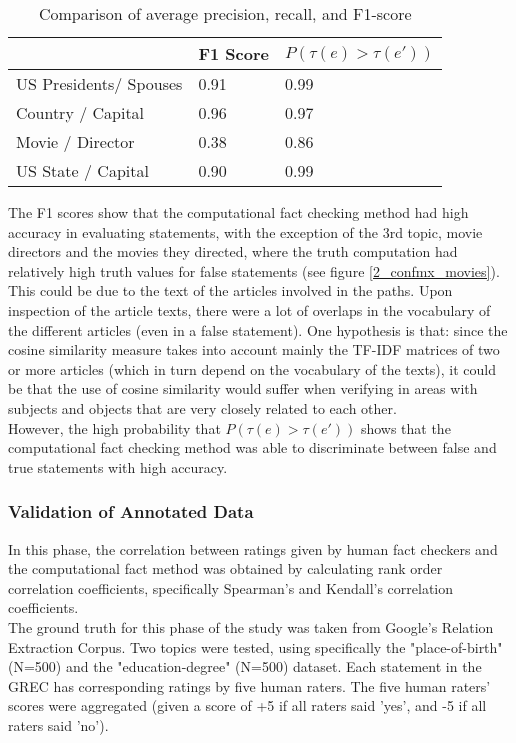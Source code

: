 \documentclass[10pt,11pt,12pt,oneside]{book}
\begin{document}
\begin{table}[H]
	\begin{tabular}{ | p{5cm} || p{4.8cm} | p{4.8cm} |}
		\hline
		& F1 Score & $ P (\tau (e) > \tau (e \prime)) $ \\
		\hline
		US Presidents/ Spouses & 0.91 & 0.99\\
		\hline
		Country / Capital & 0.96 & 0.97\\  
		\hline
		Movie / Director & 0.38 & 0.86\\
		\hline
		US State / Capital & 0.90 & 0.99\\
		\hline
	\end{tabular}
	\caption{Comparison of average precision, recall, and F1-score}
	\label{table_phase2}
\end{table}

The F1 scores show that the computational fact checking method had high accuracy in evaluating statements, with the exception of the 3rd topic, movie directors and the movies they directed, where the truth computation had relatively high truth values for false statements (see figure \ref{2_confmx_movies}). This could be due to the text of the articles involved in the paths. Upon inspection of the article texts, there were a lot of overlaps in the vocabulary of the different articles (even in a false statement). One hypothesis is that: since the cosine similarity measure takes into account mainly the TF-IDF matrices of two or more articles (which in turn depend on the vocabulary of the texts), it could be that the use of cosine similarity would suffer when verifying in areas with subjects and objects that are very closely related to each other.\\

However, the high probability that $ P (\tau (e) > \tau (e \prime)) $ shows that the computational fact checking method was able to discriminate between false and true statements with high accuracy.
\newpage
\subsubsection{Validation of Annotated Data}
In this phase, the correlation between ratings given by human fact checkers and the computational fact method was obtained by calculating rank order correlation coefficients, specifically Spearman's and Kendall's correlation coefficients.\\

The ground truth for this phase of the study was taken from Google's Relation Extraction Corpus. Two topics were tested, using specifically the "place-of-birth" (N=500) and the "education-degree" (N=500) dataset. Each statement in the GREC has corresponding ratings by five human raters. The five human raters' scores were aggregated (given a score of +5 if all raters said 'yes', and -5 if all raters said 'no').\\
\end{document}
